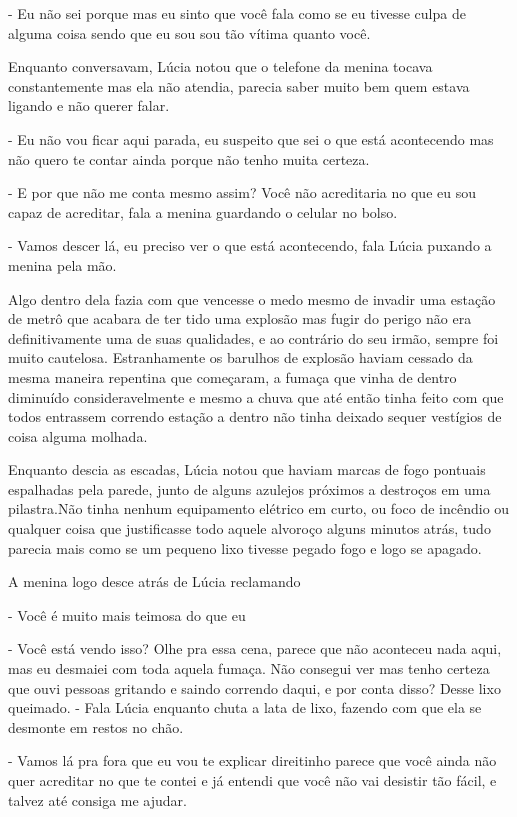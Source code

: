 - Eu não sei porque mas eu sinto que você fala como se eu tivesse culpa de alguma coisa sendo que eu sou sou tão vítima quanto você.


Enquanto conversavam, Lúcia notou que o telefone da menina tocava constantemente mas ela não atendia, parecia saber muito bem quem estava ligando e não querer falar.

- Eu não vou ficar aqui parada, eu suspeito que sei o que está acontecendo mas não quero te contar ainda porque não tenho muita certeza.

- E por que não me conta mesmo assim? Você não acreditaria no que eu sou capaz de acreditar, fala a menina guardando o celular no bolso.

- Vamos descer lá, eu preciso ver o que está acontecendo, fala Lúcia puxando a menina pela mão.

Algo dentro dela fazia com que vencesse o medo mesmo de invadir uma estação de metrô que acabara de ter tido uma explosão mas fugir do perigo não era definitivamente uma de suas qualidades, e ao contrário do seu irmão, sempre foi muito cautelosa.
Estranhamente os barulhos de explosão haviam cessado da mesma maneira repentina que começaram, a fumaça que vinha de dentro diminuído consideravelmente e mesmo a chuva que até então tinha feito com que todos entrassem correndo estação a dentro não tinha deixado sequer vestígios de coisa alguma molhada.

Enquanto descia as escadas, Lúcia notou que haviam marcas de fogo pontuais espalhadas pela parede, junto de alguns azulejos próximos a destroços em uma pilastra.Não tinha nenhum equipamento elétrico em curto, ou foco de incêndio ou qualquer coisa que justificasse todo aquele alvoroço alguns minutos atrás, tudo parecia mais como se um pequeno lixo tivesse pegado fogo e logo se apagado. 

A menina logo desce atrás de Lúcia reclamando

- Você é muito mais teimosa do que eu

- Você está vendo isso? Olhe pra essa cena, parece que não aconteceu nada aqui, mas eu desmaiei com toda aquela fumaça. Não consegui ver mas tenho certeza que ouvi pessoas gritando e saindo correndo daqui, e por conta disso? Desse lixo queimado. - Fala Lúcia enquanto chuta a lata de lixo, fazendo com que ela se desmonte em restos no chão.

- Vamos lá pra fora que eu vou te explicar direitinho parece que você ainda não quer acreditar no que te contei e já entendi que você não vai desistir tão fácil, e talvez até consiga me ajudar.

